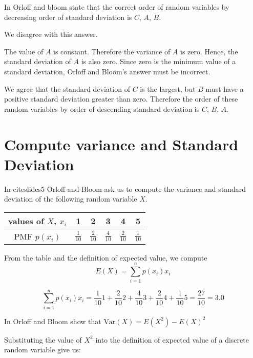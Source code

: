 \documentclass[a4paper,11pt]{article}
\begin{document}
In \cite{slides5Ans} Orloff and bloom state that the correct order of random
variables by decreasing order of standard deviation is $C$, $A$, $B$.

We disagree with this answer.

The value of $A$ is constant.  Therefore the variance of $A$ is zero.  Hence,
the standard deviation of $A$ is also zero.  Since zero is the minimum value
of a standard deviation, Orloff and Bloom's answer must be incorrect.

We agree that the standard deviation of $C$ is the largest, but $B$ must have
a positive standard deviation greater than zero.  Therefore the order of these
random variables by order of descending standard deviation is $C$, $B$, $A$.

\section{Compute variance and Standard Deviation}

In cite{slides5} Orloff and Bloom ask us to compute the variance and standard
deviation of the following random variable $X$.

\begin{center}
\begin{tabular}{ | c | c | c |  c | c | c | }
  \hline
  values of $X$, $x_{i}$ & 1 & 2 & 3 & 4 & 5  \\ \hline
  PMF $p\left( x_i \right)$ & $\frac{1}{10}$ & $\frac{2}{10}$ & $\frac{4}{10}$
    & $\frac{2}{10}$ & $\frac{1}{10}$ \\ \hline
\end{tabular}
\end{center}

From the table and the definition of expected value, we compute
\begin{equation}
    E\left(X \right) =
      \sum_{i=1}^{n} p\left( x_{i} \right) x_i
\end{equation}

\begin{equation}
      \sum_{i=1}^{n} p\left( x_{i} \right) x_i
  = \frac{1}{10} 1 + \frac{2}{10} 2 + \frac{4}{10} 3 + \frac{2}{10} 4 +
    \frac{1}{10} 5 = \frac{27}{10} = 3.0
\end{equation}

In \cite{reading5a} Orloff and Bloom show that
$\text{Var}\left(X \right) = E \left(X^{2}\right) - E\left( X \right)^{2}$

Substituting the value of $X^{2}$ into the definition of expected value of
a discrete random variable give us:
\end{document}
